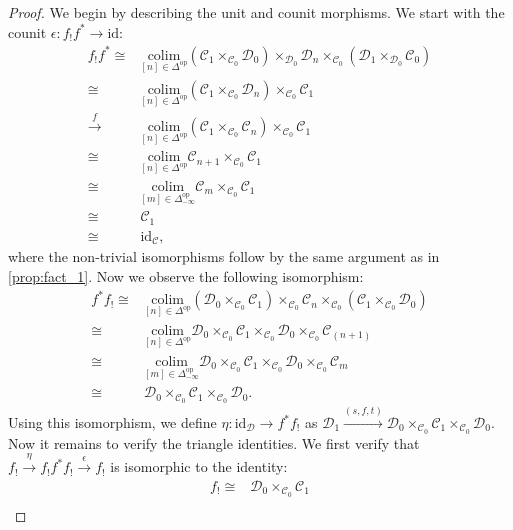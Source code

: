 \documentclass[a4paper, reqno]{amsart}
\theoremstyle{definition}
\newcommand\cC{\mathscr C}
\newcommand\cD{\mathscr D}
\newcommand\id{\mathrm{id}}
\newcommand\op{\mathrm{op}}
\newcommand\colim{\mathrm{colim}}
\begin{document}
\begin{proof}
We begin by describing the unit and counit morphisms. We start with the counit $\epsilon:f_!f^*\rightarrow\id$:
\begin{equation*}
    \begin{split}
        f_!f^*\cong&\underset{[n]\in\Delta^\op}{\colim}(\cC_1\times_{\cC_0}\cD_0)\times_{\cD_0}\cD_n\times_{\cC_0}(\cD_1\times_{\cD_0}\cC_0)\\
        \cong &\underset{[n]\in\Delta^\op}{\colim}(\cC_1\times_{\cC_0}\cD_n)\times_{\cC_0}\cC_1\\
        \xrightarrow{f}&\underset{[n]\in\Delta^\op}{\colim}(\cC_1\times_{\cC_0}\cC_n)\times_{\cC_0}\cC_1\\
        \cong&\underset{[n]\in\Delta^\op}{\colim}\cC_{n+1}\times_{\cC_0}\cC_1\\
        \cong&\underset{[m]\in\Delta^\op_{-\infty}}{\colim}\cC_{m}\times_{\cC_0}\cC_1\\
        \cong&\cC_1\\
        \cong&\id_\cC,
    \end{split}
\end{equation*}
where the non-trivial isomorphisms follow by the same argument as in \cref{prop:fact_1}.
Now we observe the following isomorphism:
\begin{equation*}
    \begin{split}
        f^*f_!\cong&\underset{[n]\in\Delta^\op}{\colim}(\cD_0\times_{\cC_0}\cC_1)\times_{\cC_0}\cC_n\times_{\cC_0}(\cC_1\times_{\cC_0}\cD_0)\\
        \cong&\underset{[n]\in\Delta^\op}{\colim}\cD_0\times_{\cC_0}\cC_1\times_{\cC_0}\cD_0\times_{\cC_0}\cC_{(n+1)}\\
        \cong&\underset{[m]\in\Delta^\op_{-\infty}}{\colim}\cD_0\times_{\cC_0}\cC_1\times_{\cC_0}\cD_0\times_{\cC_0}\cC_{m}\\
        \cong&\cD_0\times_{\cC_0}\cC_1\times_{\cC_0}\cD_0.
    \end{split}
\end{equation*}
Using this isomorphism, we define $\eta:\id_\cD\rightarrow f^*f_!$ as $\cD_1\xrightarrow{(s,f,t)}\cD_0\times_{\cC_0}\cC_1\times_{\cC_0}\cD_0$. Now it remains to verify the triangle identities. We first verify that $f_!\xrightarrow{\eta}f_!f^*f_!\xrightarrow{\epsilon}f_!$ is isomorphic to the identity:
\begin{equation*}
    \begin{split}
        f_!\cong&\cD_0\times_{\cC_0}\cC_1\\

\end{split}
\end{equation*}
\end{proof}
\end{document}
